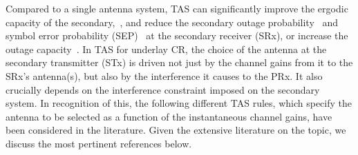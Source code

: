 \documentclass[12pt,draftcls,peerreview,onecolumn]{IEEEtran}
\begin{document}
Compared to a single antenna system, TAS can significantly improve the ergodic capacity of the secondary,~\cite{Hanif_2015_globecom,Wang_2010_TWC}, and reduce the secondary outage probability~\cite{Hanif_2015_globecom,Kong_2011_JCN} and symbol error probability (SEP)~\cite{Sarvendranath_2013_TCOM,Sarvendranath_2014_TCOM} at the secondary receiver (SRx), or increase the outage capacity~\cite{Kong_2011_JCN}. In TAS for underlay CR, the choice of the antenna at the secondary transmitter (STx) is driven not just by the channel gains from it to the SRx's antenna(s), but also by the interference it causes to the PRx. It also crucially depends on the interference constraint imposed on the secondary system. In recognition of this, the following different TAS rules, which specify the antenna to be selected as a function of the instantaneous channel gains, have been considered in the literature. Given the extensive literature on the topic, we discuss the most pertinent references below.
%
\end{document}
